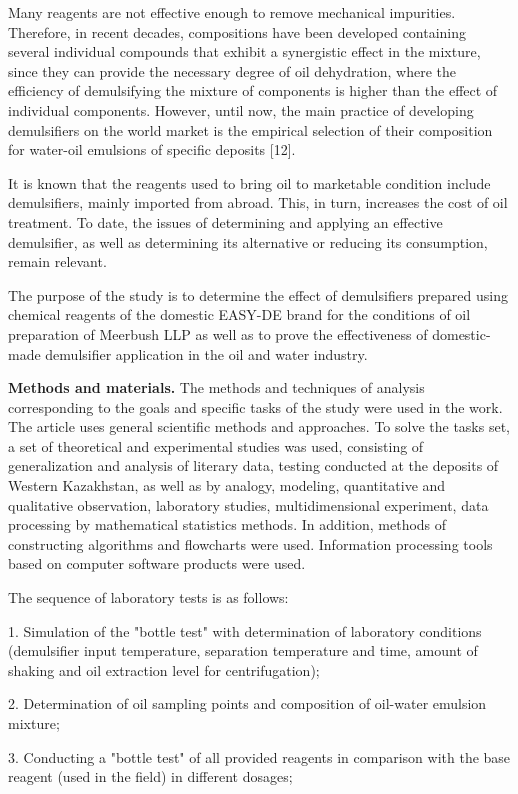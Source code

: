 Many reagents are not effective enough to remove mechanical impurities.
Therefore, in recent decades, compositions have been developed
containing several individual compounds that exhibit a synergistic
effect in the mixture, since they can provide the necessary degree of
oil dehydration, where the efficiency of demulsifying the mixture of
components is higher than the effect of individual components. However,
until now, the main practice of developing demulsifiers on the world
market is the empirical selection of their composition for water-oil
emulsions of specific deposits {[}12{]}.

It is known that the reagents used to bring oil to marketable condition
include demulsifiers, mainly imported from abroad. This, in turn,
increases the cost of oil treatment. To date, the issues of determining
and applying an effective demulsifier, as well as determining its
alternative or reducing its consumption, remain relevant.

The purpose of the study is to determine the effect of demulsifiers
prepared using chemical reagents of the domestic EASY-DE brand for the
conditions of oil preparation of Meerbush LLP as well as to prove the
effectiveness of domestic-made demulsifier application in the oil and
water industry.

\textbf{Methods and materials.} The methods and techniques of analysis
corresponding to the goals and specific tasks of the study were used in
the work. The article uses general scientific methods and approaches. To
solve the tasks set, a set of theoretical and experimental studies was
used, consisting of generalization and analysis of literary data,
testing conducted at the deposits of Western Kazakhstan, as well as by
analogy, modeling, quantitative and qualitative observation, laboratory
studies, multidimensional experiment, data processing by mathematical
statistics methods. In addition, methods of constructing algorithms and
flowcharts were used. Information processing tools based on computer
software products were used.

The sequence of laboratory tests is as follows:

1. Simulation of the "bottle test" with determination of laboratory
conditions (demulsifier input temperature, separation temperature and
time, amount of shaking and oil extraction level for centrifugation);

2. Determination of oil sampling points and composition of oil-water
emulsion mixture;

3. Conducting a "bottle test" of all provided reagents in comparison
with the base reagent (used in the field) in different dosages;

